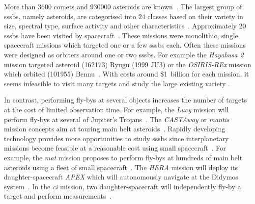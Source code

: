 More than \SI{3600}{} comets and \SI{930000}{} asteroids are known~\cite{nasaSBD_count, mpc2020}. The largest group of \glspl{sssb}, namely asteroids, are categorised into \SI{24}{} classes based on their variety in size, spectral type, surface activity and other characteristics~\cite{demeo2009extension}. Approximately \SI{20}{} \glspl{sssb} have been visited by spacecraft~\cite{nasaSBD_missions}. These missions were monolithic, single spacecraft missions which targeted one or a few \glspl{sssb} each. Often these missions were designed as orbiters around one or two \glspl{sssb}. For example the \textit{Hayabusa 2} mission targeted asteroid (162173) Ryugu (1999 JU3) or the \textit{OSIRIS-REx} mission which orbited (101955) Bennu~\cite{Watanabe2017Hayabusa2Overview, lauretta2017osiris}. With costs around \$1~billion for each mission, it seems infeasible to visit many targets and study the large existing variety \cite{ESARosettasQuestions, ArizonaOSIRIS-RExQuestions}.

In contrast, performing fly-bys at several objects increases the number of targets at the cost of limited observation time. For example, the \textit{Lucy} mission will perform fly-bys at several of Jupiter's Trojans~\cite{stanbridge2017lucy}. The \textit{CASTAway} or \textit{\gls{mantis}} mission concepts aim at touring main belt asteroids~\cite{bowles2018castaway, rivkin2016mainmantis}. Rapidly developing technology provides more opportunities to study \glspl{sssb} since interplanetary missions become feasible at a reasonable cost using small spacecraft~\cite{Poghosyan2017CubeSatMissions, andrews2019asteroid, snodgrass2019europeanCI}. For example, the \textit{\gls{mat}} mission proposes to perform fly-bys at hundreds of main belt asteroids using a fleet of small spacecraft~\cite{Slavinskis2018NanospacecraftSails}. The \textit{HERA} mission will deploy its daughter-spacecraft \textit{APEX} which will autonomously navigate at the Didymos system~\cite{Kohout2018FeasibilityStudy}. In the \textit{\gls{ci}} mission, two daughter-spacecraft will independently fly-by a target and perform measurements~\cite{snodgrass2019europeanCI}.

